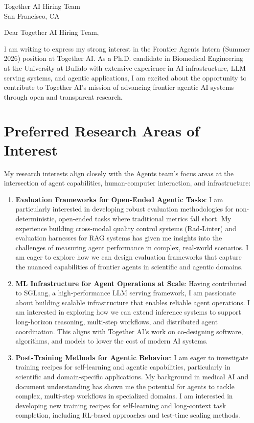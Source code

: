 \documentclass[11pt,a4paper]{letter}
\begin{document}
\begin{letter}{Together AI Hiring Team \\ San Francisco, CA}

\opening{Dear Together AI Hiring Team,}

I am writing to express my strong interest in the Frontier Agents Intern (Summer 2026) position at Together AI. As a Ph.D. candidate in Biomedical Engineering at the University at Buffalo with extensive experience in AI infrastructure, LLM serving systems, and agentic applications, I am excited about the opportunity to contribute to Together AI's mission of advancing frontier agentic AI systems through open and transparent research.

\section*{Preferred Research Areas of Interest}

My research interests align closely with the Agents team's focus areas at the intersection of agent capabilities, human-computer interaction, and infrastructure:

\begin{enumerate}
\item \textbf{Evaluation Frameworks for Open-Ended Agentic Tasks}: I am particularly interested in developing robust evaluation methodologies for non-deterministic, open-ended tasks where traditional metrics fall short. My experience building cross-modal quality control systems (Rad-Linter) and evaluation harnesses for RAG systems has given me insights into the challenges of measuring agent performance in complex, real-world scenarios. I am eager to explore how we can design evaluation frameworks that capture the nuanced capabilities of frontier agents in scientific and agentic domains.

\item \textbf{ML Infrastructure for Agent Operations at Scale}: Having contributed to SGLang, a high-performance LLM serving framework, I am passionate about building scalable infrastructure that enables reliable agent operations. I am interested in exploring how we can extend inference systems to support long-horizon reasoning, multi-step workflows, and distributed agent coordination. This aligns with Together AI's work on co-designing software, algorithms, and models to lower the cost of modern AI systems.

\item \textbf{Post-Training Methods for Agentic Behavior}: I am eager to investigate training recipes for self-learning and agentic capabilities, particularly in scientific and domain-specific applications. My background in medical AI and document understanding has shown me the potential for agents to tackle complex, multi-step workflows in specialized domains. I am interested in developing new training recipes for self-learning and long-context task completion, including RL-based approaches and test-time scaling methods.


\end{enumerate}
\end{letter}
\end{document}
